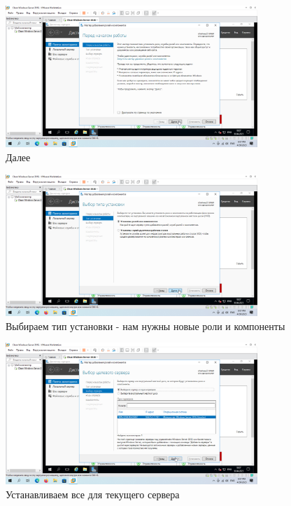 \documentclass[a4paper]{article}
\begin{document}
  \begin{figure}[H]
    \centering
    \includegraphics[width=0.85\textwidth]{Screenshot_39}
    \caption{Далее}
    \label{img:39}
  \end{figure}

  \begin{figure}[H]
    \centering
    \includegraphics[width=0.85\textwidth]{Screenshot_40}
    \caption{Выбираем тип установки - нам нужны новые роли и компоненты}
    \label{img:40}
  \end{figure}

  \begin{figure}[H]
    \centering
    \includegraphics[width=0.85\textwidth]{Screenshot_41}
    \caption{Устанавливаем все для текущего сервера}
    \label{img:41}
  \end{figure}
\end{document}
